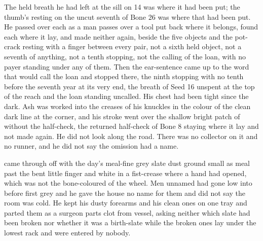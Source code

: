 The held breath he had left at the sill on  14 was where it had been put; the thumb's resting on the uncut seventh of Bone 26 was where that had been put. He passed over each as a man passes over a tool put back where it belongs, found each where it lay, and made neither again, beside the five objects and the pot-crack resting with a finger between every pair, not a sixth held object, not a seventh of anything, not a tenth stopping, not the calling of the loan, with no payer standing under any of them. Then the ear-sentence came up to the word that would call the loan and stopped there, the ninth stopping with no tenth before the seventh year at its very end, the breath of Seed 16 unspent at the top of the reach and the loan standing uncalled. His chest had been tight since the dark. Ash was worked into the creases of his knuckles in the colour of the clean dark line at the corner, and his stroke went over the shallow bright patch of  without the half-check, the returned half-check of Bone 8 staying where it lay and not made again. He did not look along the road. There was no collector on it and no runner, and he did not say the omission had a name.

\scenebreak

 came through  off  with the day's meal-fine grey slate dust ground small as meal past the bent little finger and white in a fist-crease where a hand had opened, which was not the bone-coloured  of the wheel. Men unnamed had gone low into  before first grey and he gave the house no name for them and did not say the room was cold. He kept his dusty forearms and his clean ones on one tray and parted them as a surgeon parts clot from vessel, asking neither which slate had been broken nor whether it was a birth-slate while the broken ones lay under the lowest rack and were entered by nobody.

